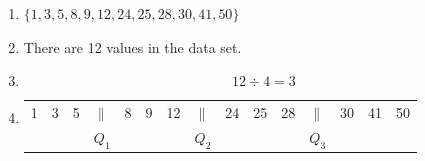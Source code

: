 \begin{description}[noitemsep]
\begin{description}[noitemsep]
{\begin{mdframed}[linewidth=4, leftmargin=40, rightmargin=40]
\begin{exercise}
\begin{enumerate}[noitemsep, label=\textbf{Step} \textbf{\arabic*}. ]
            \leftskip=20pt\rightskip=\leftskip\item  
          \label{m39400*id213613}
            $\{1,3,5,8,9,12,24,25,28,30,41,50\}$
          \par 
          \item  
          \label{m39400*id213680}There are 12 values in the data set.\par 
          \item  
          \label{m39400*id213688}\nopagebreak\noindent{}
            
    \begin{equation}
    12÷4=3\tag{16.6}
      \end{equation}
          \item  
          \begin{table}[H]
        \begin{center}
      \label{m39400*id213712}
    \noindent
      \tablelasttail{}
      \begin{xtabular}[t]{|l|l|l|l|l|l|l|l|l|l|l|l|l|l|l|} &
        3 &
        5 &
                    $\parallel $
                   &
        8 &
        9 &
        12 &
                    $\parallel $
                   &
        24 &
        25 &
        28 &
                    $\parallel $
                   &
        30 &
        41 &
        50%
     \tabularnewline{}
         &
         &
         &
                    ${Q}_{1}$
                   &
         &
         &
         &
                    ${Q}_{2}$
                   &
         &
         &
         &
                    ${Q}_{3}$
                   &
         &
         &
     \tabularnewline{}

\end{xtabular}
\end{center}
\end{table}
\end{enumerate}
\end{exercise}
\end{mdframed}}
\end{description}
\end{description}

